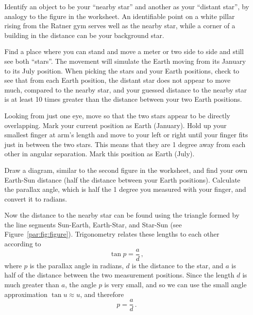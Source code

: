 \begin{steps}
	\item Identify an object to be your ``nearby star'' and another as your ``distant star'', by analogy to the figure in the worksheet. An identifiable point on a white pillar rising from the Ratner gym serves well as the nearby star, while a corner of a building in the distance can be your background star.
	
	\item Find a place where you can stand and move a meter or two side to side and still see both ``stars''. The movement will simulate the Earth moving from its January to its July position. When picking the stars and your Earth positions, check to see that from each Earth position, the distant star does not appear to move much, compared to the nearby star, and your guessed distance to the nearby star is at least 10 times greater than the distance between your two Earth positions.
	
	\item Looking from just one eye, move so that the two stars appear to be directly overlapping. Mark your current position as Earth (January). Hold up your smallest finger at arm's length and move to your left or right until your finger fits just in between the two stars. This means that they are 1 degree away from each other in angular separation. Mark this position as Earth (July).
	
	\item Draw a diagram, similar to the second figure in the worksheet, and find your own Earth-Sun distance (half the distance between your Earth positions). Calculate the parallax angle, which is half the 1 degree you measured with your finger, and convert it to radians.
\end{steps}
	
Now the distance to the nearby star can be found using the triangle formed by the line segments Sun-Earth, Earth-Star, and Star-Sun (see Figure~\ref{par:fig:figure}). Trigonometry relates these lengths to each other according to
\begin{equation}
	\tan p = \frac{a}{d}\,,
\end{equation}
where $p$ is the parallax angle in radians, $d$ is the distance to the star, and $a$ is half of the distance between the two measurement positions. Since the length $d$ is much greater than $a$, the angle $p$ is very small, and so we can use the small angle approximation $\tan u \approx u$, and therefore
\begin{equation}\label{par:eq:pad}
	p = \frac{a}{d}\,.
\end{equation}

